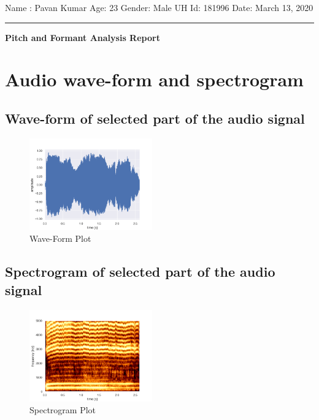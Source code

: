 \documentclass{article}%
\begin{document}
%
\normalsize%
\begin{minipage}{\textwidth}%
\flushleft%
Name : Pavan Kumar%
\newline%
Age: 23%
\newline%
Gender: Male%
\newline%
UH Id: 181996%
\newline%
Date: March 13, 2020%
\linebreak%
\noindent\rule{\textwidth}{1pt}%
\newline%
\linebreak%
\begin{minipage}{\textwidth}%
\centering%
\begin{Large}%
\textbf{Pitch and Formant Analysis Report}%
\end{Large}%
\end{minipage}%
\end{minipage}%
\section{Audio wave{-}form and spectrogram}%
\label{sec:Audiowave{-}formandspectrogram}%
\subsection{Wave{-}form of selected part of the audio signal}%
\label{subsec:Wave{-}formofselectedpartoftheaudiosignal}%


\begin{figure}[h!]%
\centering%
\includegraphics[width=200px]{sound.png}%
\caption{Wave{-}Form Plot}%
\end{figure}

%
\subsection{Spectrogram of selected part of the audio signal}%
\label{subsec:Spectrogramofselectedpartoftheaudiosignal}%


\begin{figure}[h!]%
\centering%
\includegraphics[width=200px]{spectrogram.png}%
\caption{Spectrogram Plot}%
\end{figure}
\end{document}
